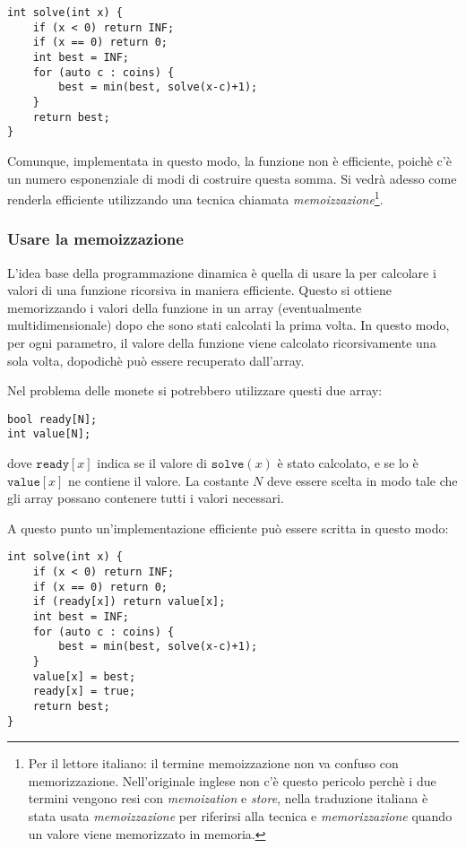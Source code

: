 \begin{lstlisting}
int solve(int x) {
    if (x < 0) return INF;
    if (x == 0) return 0;
    int best = INF;
    for (auto c : coins) {
        best = min(best, solve(x-c)+1);
    }
    return best;
}
\end{lstlisting}

Comunque, implementata in questo modo,
la funzione non è efficiente,
poichè c'è un numero esponenziale
di modi di costruire questa somma.
Si vedrà adesso come renderla efficiente
utilizzando una tecnica chiamata \emph{memoizzazione}\footnote{Per il lettore italiano: 
il termine memoizzazione non va confuso con memorizzazione. Nell'originale inglese non c'è
questo pericolo perchè i due termini vengono resi con \emph{memoization} e \emph{store}, nella 
traduzione italiana è stata usata \emph{memoizzazione} per 
riferirsi alla tecnica e \emph{memorizzazione} quando un
valore viene memorizzato in memoria.}.

\subsubsection{Usare la memoizzazione}


L'idea base della programmazione dinamica è quella
di usare la  
per calcolare i valori di una funzione ricorsiva
in maniera efficiente.
Questo si ottiene memorizzando i valori della funzione
in un array (eventualmente multidimensionale) dopo che sono stati calcolati la prima volta.
In questo modo, per ogni parametro, il valore della funzione viene calcolato
ricorsivamente una sola volta, dopodichè può essere
recuperato dall'array.

Nel problema delle monete si potrebbero utilizzare
questi due array:

\begin{lstlisting}
bool ready[N];
int value[N];
\end{lstlisting}

dove $\texttt{ready}[x]$ indica se il valore di
$\texttt{solve}(x)$ è stato calcolato,
e se lo è $\texttt{value}[x]$
ne contiene il valore.
La costante $N$ deve essere scelta in modo tale
che gli array possano contenere tutti i valori necessari.

A questo punto un'implementazione efficiente
può essere scritta in questo modo:

\begin{lstlisting}
int solve(int x) {
    if (x < 0) return INF;
    if (x == 0) return 0;
    if (ready[x]) return value[x];
    int best = INF;
    for (auto c : coins) {
        best = min(best, solve(x-c)+1);
    }
    value[x] = best;
    ready[x] = true;
    return best;
}
\end{lstlisting}

